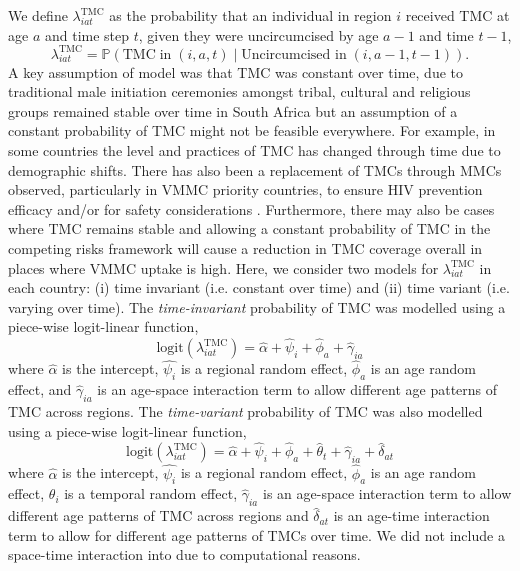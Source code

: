 \documentclass{article}
\begin{document}
\begin{appendix}
\noindent We define $\lambda^{\text{TMC}}_{iat}$ as the probability that an individual in region $i$ received TMC at age $a$ and time step $t$, given they were uncircumcised by age $a-1$ and time $t-1$, 
\begin{equation} 
		\lambda^{\text{TMC}}_{iat} = \mathbb{P}(\text{TMC} \; \text{in} \; (i,a,t) \; | \; \text{Uncircumcised in} \; (i,a-1, t-1)). 
	\label{eqn::TMC}
\end{equation}
A key assumption of \cite{thomas2021multilevel} model was that TMC was constant over time, due to traditional male initiation ceremonies amongst tribal, cultural and religious groups remained stable over time in South Africa but an assumption of a constant probability of TMC might not be feasible everywhere. For example, in some countries the level and practices of TMC has changed through time due to demographic shifts. There has also been a replacement of TMCs through MMCs observed, particularly in VMMC priority countries, to ensure HIV prevention efficacy and/or for safety considerations \cite{thomas2021multilevel}. Furthermore, there may also be cases where TMC remains stable and allowing a constant probability of TMC in the competing risks framework will cause a reduction in TMC coverage overall in places where VMMC uptake is high. Here, we consider two models for $\lambda^{\text{TMC}}_{iat}$ in each country: (i) time invariant (i.e. constant over time) and (ii) time variant (i.e. varying over time). The {\it time-invariant} probability of TMC was modelled using a piece-wise logit-linear function, 
\begin{equation*} 
	\text{logit}(\lambda^{\text{TMC}}_{iat}) = \hat{\alpha} + \hat{\psi}_i + \hat{\phi}_a + \hat{\gamma}_{ia}
\end{equation*}
where $\hat{\alpha}$ is the intercept, $\hat{\psi_i}$ is a regional random effect, $\hat{\phi}_a$ is an age random effect, and $\hat{\gamma}_{ia}$ is an age-space interaction term to allow different age patterns of TMC across regions. The {\it time-variant} probability of TMC was also modelled using a piece-wise logit-linear function, 
\begin{equation*} 
	\text{logit}(\lambda^{\text{TMC}}_{iat}) = \hat{\alpha} + \hat{\psi}_i + \hat{\phi}_a + \hat{\theta}_t + \hat{\gamma}_{ia} + \hat{\delta}_{at}
\end{equation*}
where $\hat{\alpha}$ is the intercept, $\hat{\psi_i}$ is a regional random effect, $\hat{\phi}_a$ is an age random effect, $\theta_i$ is a temporal random effect,  $\hat{\gamma}_{ia}$ is an age-space interaction term to allow different age patterns of TMC  across regions and $\hat{\delta}_{at}$ is an age-time interaction term to allow for different age patterns of TMCs over time. We did not include a space-time interaction into due to computational reasons. 


\end{appendix}
\end{document}
